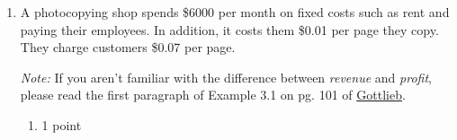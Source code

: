 \documentclass{article}
\begin{document}
\begin{enumerate}
\begin{enumerate}
  \item
    \begin{problem}[\nstretch{0.75}]
      The line $\mathcal{L}$ shown below. (Express your answer
      in terms of $f$, $a$, and $b$.)

    \end{problem}

    \begin{solution}
      We can write down the coordinates of two points on the line: $(a, f(a))$ and $(b, f(b))$.
      We can write down the equation of the line in point-slope form as
      \[\boxed{y-f(a)=\frac{f(b)-f(a)}{b-a}(x-a).}\]
    \end{solution}

  \end{enumerate}

\item %

  A photocopying shop spends \$6000 per month on fixed costs such as
  rent and paying their employees. In addition, it costs them \$0.01
  per page they copy. They charge customers \$0.07 per page.

  \emph{Note:} If you aren't familiar with the difference between \emph{revenue} and \emph{profit}, please read the first paragraph of Example 3.1 on pg. 101 of \href{https://canvas.harvard.edu/courses/138327/files/20608911?wrap=1}{Gottlieb}.

  \begin{enumerate}

  \item

    \begin{grading}
      1 point
    \end{grading}


\end{enumerate}
\end{enumerate}
\end{document}
